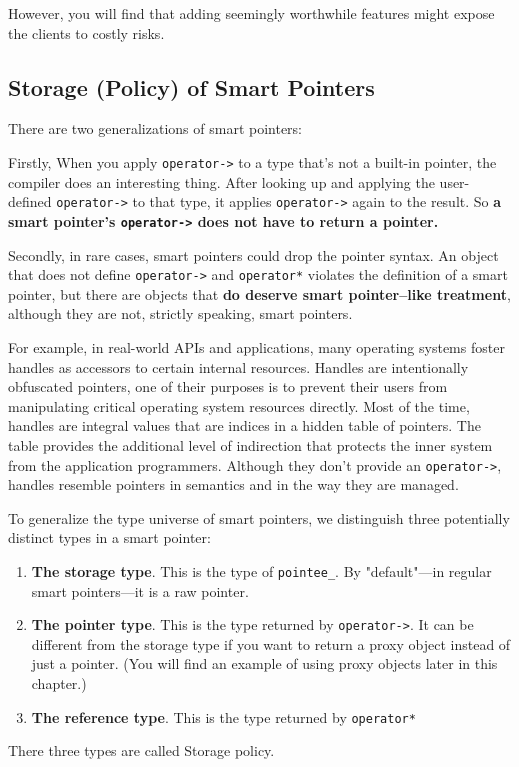 However, you will find that adding seemingly worthwhile features might
expose the clients to costly risks.

\subsection{Storage (Policy) of Smart Pointers}

There are two generalizations of smart pointers:

Firstly, When you apply \texttt{operator->} to a type that's not a
built-in pointer, the compiler does an interesting thing. After
looking up and applying the user-defined \texttt{operator->} to that
type, it applies \texttt{operator->} again to the result. So \textbf{a
smart pointer's \texttt{operator->} does not have to return a
pointer.}

Secondly,  in rare cases, smart pointers could drop the pointer
syntax. An object that does not define \texttt{operator->} and
\texttt{operator*} violates the definition of a smart pointer, but
there are objects that \textbf{do deserve smart pointer–like
treatment}, although they are not, strictly speaking, smart pointers.

For example, in real-world APIs and applications, many operating
systems foster handles as accessors to certain internal resources.
Handles are intentionally obfuscated pointers, one of their purposes
is to prevent their users from manipulating critical operating system
resources directly.  Most of the time, handles are integral values
that are indices in a hidden table of pointers. The table provides the
additional level of indirection that protects the inner system from
the application programmers. Although they don't provide an
\texttt{operator->}, handles resemble pointers in semantics and in the
way they are managed.

To generalize the type universe of smart pointers, we distinguish
three potentially distinct types in a smart pointer:
\begin{enumerate}
\item \textbf{The storage type}. This is the type of
  \texttt{pointee\_}. By "default"—in regular smart pointers—it is a
  raw pointer. 
\item \textbf{The pointer type}. This is the type returned by
  \texttt{operator->}. It can be different from the storage type if
  you want to return a proxy object instead of just a pointer. (You
  will find an example of using proxy objects later in this chapter.)
\item \textbf{The reference type}. This is the type returned by
  \texttt{operator*}
\end{enumerate}
There three types are called Storage policy.

